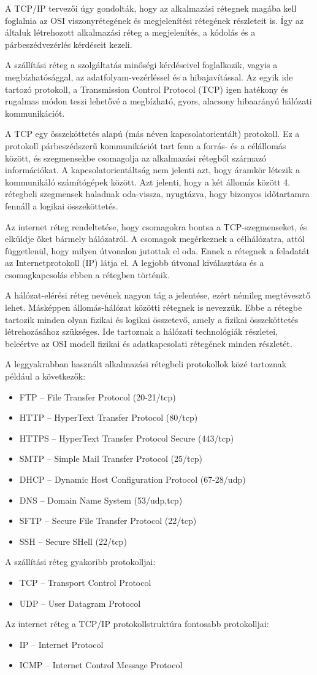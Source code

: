 A TCP/IP tervezői úgy gondolták, hogy az alkalmazási rétegnek magába kell foglalnia az OSI viszonyrétegének és megjelenítési rétegének részleteit is. Így az általuk létrehozott alkalmazási réteg a megjelenítés, a kódolás és a párbeszédvezérlés kérdéseit kezeli. 

A szállítási réteg a szolgáltatás minőségi kérdéseivel foglalkozik, vagyis a megbízhatósággal, az adatfolyam-vezérléssel és a hibajavítással. Az egyik ide tartozó protokoll, a Transmission Control Protocol (TCP) igen hatékony és rugalmas módon teszi lehetővé a megbízható, gyors, alacsony hibaarányú hálózati kommunikációt. 

A TCP egy összeköttetés alapú (más néven kapcsolatorientált) protokoll. Ez a protokoll párbeszédszerű kommunikációt tart fenn a forrás- és a célállomás között, és szegmensekbe csomagolja az alkalmazási rétegből származó információkat. A kapcsolatorientáltság nem jelenti azt, hogy áramkör létezik a kommunikáló számítógépek között. Azt jelenti, hogy a két állomás között 4. rétegbeli szegmensek haladnak oda-vissza, nyugtázva, hogy bizonyos időtartamra fennáll a logikai összeköttetés.

Az internet réteg rendeltetése, hogy csomagokra bontsa a TCP-szegmenseket, és elküldje őket bármely hálózatról. A csomagok megérkeznek a célhálózatra, attól függetlenül, hogy milyen útvonalon jutottak el oda. Ennek a rétegnek a feladatát az Internetprotokoll (IP) látja el. A legjobb útvonal kiválasztása és a csomagkapcsolás ebben a rétegben történik.

A hálózat-elérési réteg nevének nagyon tág a jelentése, ezért némileg megtévesztő lehet. Másképpen állomás-hálózat közötti rétegnek is nevezzük. Ebbe a rétegbe tartozik minden olyan fizikai és logikai összetevő, amely a fizikai összeköttetés létrehozásához szükséges. Ide tartoznak a hálózati technológiák részletei, beleértve az OSI modell fizikai és adatkapcsolati rétegének minden részletét.

A leggyakrabban használt alkalmazási rétegbeli protokollok közé tartoznak például a következők: 
\begin{itemize}[nosep]
	\item FTP -- File Transfer Protocol (20-21/tcp)
	\item HTTP -- HyperText Transfer Protocol (80/tcp)
	\item HTTPS -- HyperText Transfer Protocol Secure (443/tcp)
	\item SMTP -- Simple Mail Transfer Protocol (25/tcp)
	\item DHCP -- Dynamic Host Configuration Protocol (67-28/udp)
	\item DNS -- Domain Name System (53/udp,tcp)
	\item SFTP -- Secure File Transfer Protocol (22/tcp)
	\item SSH -- Secure SHell (22/tcp)
\end{itemize}
A szállítási réteg gyakoribb protokolljai:
\begin{itemize}[nosep]
	\item TCP -- Transport Control Protocol
	\item UDP -- User Datagram Protocol
\end{itemize}

Az internet réteg a TCP/IP protokollstruktúra fontosabb protokolljai:
\begin{itemize}[nosep]
	\item IP -- Internet Protocol
	\item ICMP -- Internet Control Message Protocol
\end{itemize}